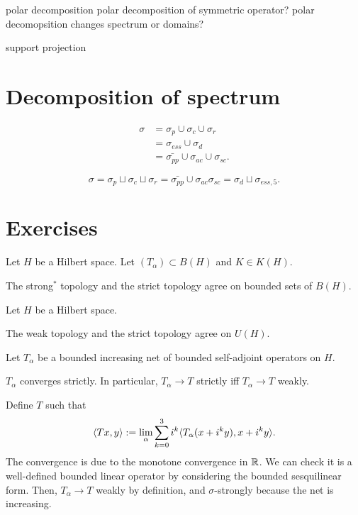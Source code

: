 \documentclass{../../large}
\begin{document}
\begin{prb}
polar decomposition
polar decomposition of symmetric operator?
polar decomopsition changes spectrum or domains?

support projection
\end{prb}



\section{Decomposition of spectrum}

\begin{align*}
\sigma
&=\sigma_p\cup\sigma_c\cup\sigma_r\\
&=\sigma_{ess}\cup\sigma_d\\
&=\bar{\sigma_{pp}}\cup\sigma_{ac}\cup\sigma_{sc}.
\end{align*}


\[\sigma=\sigma_p\sqcup\sigma_c\sqcup\sigma_r=\bar{\sigma_{pp}}\cup\sigma_{ac}\sigma_{sc}=\sigma_d\sqcup\sigma_{ess,5}.\]





\section*{Exercises}


\begin{prb}
Let $H$ be a Hilbert space.
Let $(T_\alpha)\subset B(H)$ and $K\in K(H)$.
\begin{parts}
\item The strong$^*$ topology and the strict topology agree on bounded sets of $B(H)$.
\end{parts}
\end{prb}

\begin{prb}
Let $H$ be a Hilbert space.
\begin{parts}
\item The weak topology and the strict topology agree on $U(H)$.
\end{parts}
\end{prb}


\begin{prb}
Let $T_\alpha$ be a bounded increasing net of bounded self-adjoint operators on $H$.
\begin{parts}
\item $T_\alpha$ converges strictly. In particular, $T_\alpha\to T$ strictly iff $T_\alpha\to T$ weakly.
\end{parts}
\end{prb}
\begin{pf}
Define $T$ such that
\[\langle Tx,y\rangle:=\lim_\alpha\sum_{k=0}^3i^k\langle T_\alpha(x+i^ky),x+i^ky\rangle.\]
The convergence is due to the monotone convergence in $\mathbb{R}$.
We can check it is a well-defined bounded linear operator by considering the bounded sesquilinear form.
Then, $T_\alpha\to T$ weakly by definition, and $\sigma$-strongly because the net is increasing.
\end{pf}
\end{document}
